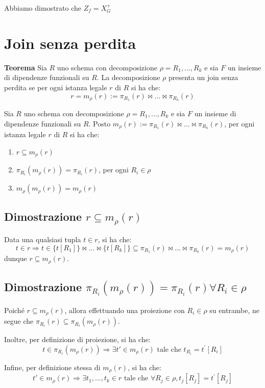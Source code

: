 \documentclass{article}
\begin{document}
Abbiamo dimostrato che \textbf{$Z_f = X_G^+$}
\pagebreak


\section{Join senza perdita}
\textbf{Teorema}
Sia $R$ uno schema con decomposizione $\rho = R_1, \ldots, R_k$ e sia $F$ un insieme di dipendenze funzionali su $R$. La decomposizione $\rho$ presenta un join senza perdita se per ogni istanza legale $r$ di $R$ si ha che:
\[ r = m_{\rho}(r) := \pi_{R_1}(r) \bowtie \ldots \bowtie \pi_{R_k}(r) \]

Sia $R$ uno schema con decomposizione $\rho = R_1, \ldots, R_k$ e sia $F$ un insieme di dipendenze funzionali su $R$. Posto $m_{\rho}(r) := \pi_{R_1}(r) \bowtie \ldots \bowtie \pi_{R_k}(r)$, per ogni istanza legale $r$ di $R$ si ha che:

\begin{enumerate}
  \item $r \subseteq m_{\rho}(r)$
  \item $\pi_{R_i}(m_{\rho}(r)) = \pi_{R_i}(r)$, per ogni $R_i \in \rho$
  \item $m_{\rho}(m_{\rho}(r)) = m_{\rho}(r)$
\end{enumerate}
\subsection{Dimostrazione $r \subseteq m_{\rho}(r)$}
Data una qualsiasi tupla $t \in r$, si ha che:
\[ t \in r \Rightarrow t \in \{t[R_1]\} \bowtie \ldots \bowtie \{t[R_k]\} \subseteq \pi_{R_1}(r) \bowtie \ldots \bowtie \pi_{R_k}(r) = m_{\rho}(r) \]
dunque $r \subseteq m_{\rho}(r)$.
\subsection{Dimostrazione  $\pi_{R_i}(m_{\rho}(r)) = \pi_{R_i}(r) \forall R_i \in \rho$}

Poiché $r \subseteq m_{\rho}(r)$, allora effettuando una proiezione con $R_i \in \rho$ su entrambe, ne segue che $\pi_{R_i}(r) \subseteq \pi_{R_i}(m_{\rho}(r))$.

Inoltre, per definizione di proiezione, si ha che:
\[ t \in \pi_{R_i}(m_{\rho}(r)) \Rightarrow \exists t' \in m_{\rho}(r) \text{ tale che } t_{R_i} = t^{'}[R_i] \]

Infine, per definizione stessa di $m_{\rho}(r)$, si ha che:
\[ t' \in m_{\rho}(r) \Rightarrow \exists t_1, \ldots, t_k \in r \text{ tale che } \forall R_j \in \rho, t_j[R_j] = t^{'}[R_j] \]
\end{document}

